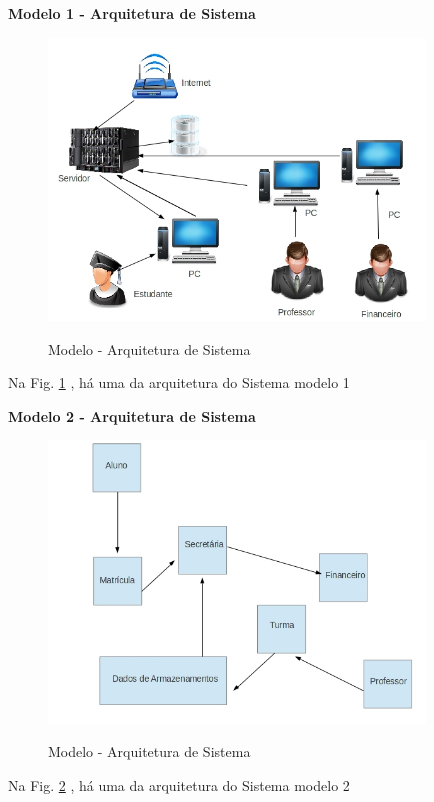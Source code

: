    \textbf{Modelo 1 - Arquitetura de Sistema }
  
       \begin{figure}[H]
                 \caption{Modelo - Arquitetura de Sistema}
               \centering %
                \includegraphics[width=10cm]{analisedeProjeto/ArquiteturaDeSoftware} %
                \label{figura:ArquiteturaDeSoftware}
                \end{figure}
                Na Fig. \ref{figura:ArquiteturaDeSoftware} , há uma da arquitetura do Sistema modelo 1
                
                
                     \textbf{Modelo 2 - Arquitetura de Sistema }  
                
                
                  \begin{figure}[H]
                 \caption{Modelo - Arquitetura de Sistema}
               \centering %
                \includegraphics[width=10cm]{analisedeProjeto/modelo2Arquitetura} %
                \label{figura:modelo2Arquitetura}
                \end{figure}
                Na Fig. \ref{figura:modelo2Arquitetura} , há uma da arquitetura do Sistema modelo 2


